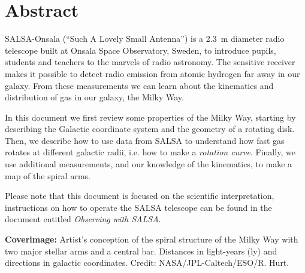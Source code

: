\chapter*{Abstract}
SALSA-Onsala (``Such A Lovely Small Antenna'') is a 2.3~m diameter radio
telescope built at Onsala Space Observatory, Sweden, to introduce pupils,
students and teachers to the marvels of radio astronomy.  The sensitive
receiver makes it possible to detect radio emission from atomic hydrogen far
away in our galaxy. From these measurements we can learn about the kinematics
and distribution of gas in our galaxy, the Milky Way. 

In this document we first review some properties of the Milky Way, starting by
describing the Galactic coordinate system and the geometry of a rotating disk.
Then, we describe how to use data from SALSA to understand how fast gas rotates
at different galactic radii, i.e. how to make a \emph{rotation curve}. Finally,
we use additional measurements, and our knowledge of the kinematics, to make a
map of the spiral arms.

Please note that this document is focused on the scientific interpretation, 
instructions on how to operate the SALSA telescope can be found in the document
entitled \emph{Observing with SALSA}.


\vspace{9cm}




{\bf Coverimage:} Artist's conception of the spiral structure of the
Milky Way with two major stellar arms and a central bar. Distances in
light-years (ly) and directions in galactic coordinates. Credit:
NASA/JPL-Caltech/ESO/R. Hurt.
